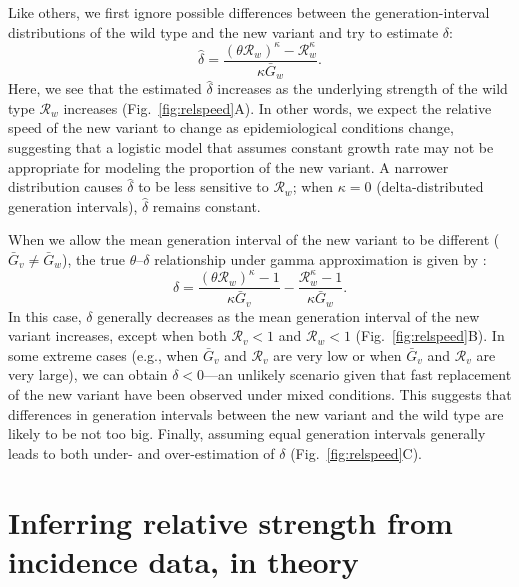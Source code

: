 \documentclass[12pt]{article}
\newcommand{\fref}[1]{Fig.~\ref{fig:#1}}
\newcommand{\RR}{\ensuremath{{\mathcal R}}\xspace}
\begin{document}
Like others, we first ignore possible differences between the generation-interval distributions of the wild type and the new variant and try to estimate $\delta$:
\begin{equation}
\hat{\delta} = \frac{(\theta \RR_w)^{\kappa} - \RR_w^{\kappa}}{\kappa \bar{G}_w}.
\end{equation}
Here, we see that the estimated $\hat{\delta}$ increases as the underlying strength of the wild type $\RR_w$ increases (\fref{relspeed}A).
In other words, we expect the relative speed of the new variant to change as epidemiological conditions change, suggesting that a logistic model that assumes constant growth rate may not be appropriate for modeling the proportion of the new variant.
A narrower distribution causes $\hat{\delta}$ to be less sensitive to $\RR_w$;
when $\kappa = 0$ (delta-distributed generation intervals), $\hat{\delta}$ remains constant.

When we allow the mean generation interval of the new variant to be different ($\bar{G}_v \neq \bar{G}_w$), the true $\theta$--$\delta$ relationship under gamma approximation is given by \citep{park2019practical}:
\begin{equation}
\delta = \frac{(\theta \RR_w)^{\kappa} - 1}{\kappa \bar{G}_v} - \frac{\RR_w^{\kappa} - 1}{\kappa \bar{G}_w}.
\end{equation}
In this case, $\delta$ generally decreases as the mean generation interval of the new variant increases, except when both $\RR_v < 1$ and $\RR_w < 1$ (\fref{relspeed}B).
In some extreme cases (e.g., when $\bar{G}_v$ and $\RR_v$ are very low or when $\bar{G}_v$ and $\RR_v$ are very large), we can obtain $\delta < 0$---an unlikely scenario given that fast replacement of the new variant have been observed under mixed conditions.
This suggests that differences in generation intervals between the new variant and the wild type are likely to be not too big.
Finally, assuming equal generation intervals generally leads to both under- and over-estimation of $\delta$ (\fref{relspeed}C).

\section{Inferring relative strength from incidence data, in theory}
\end{document}
